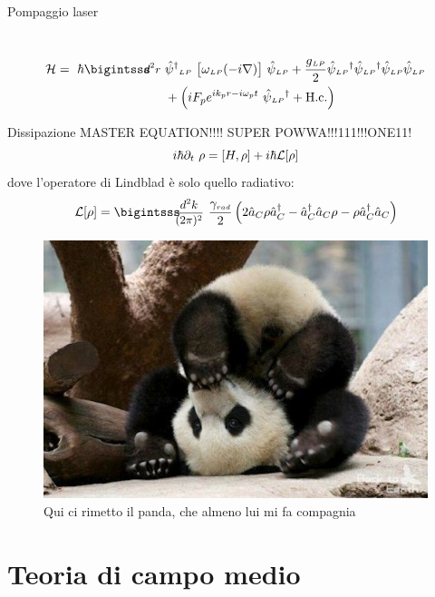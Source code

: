 \documentclass[10pt]{beamer}
\begin{document}
\begin{frame}{Pompaggio laser}
{\begin{columns}
\begin{column}{.6\textwidth}
\begin{figure}
      \end{figure}
  \end{column}
 \end{columns}
}
\normalsize
\begin{align*}
  \ham = \ \hbar \intr & \opsi^\dagger\lp \ \big[ \omega\lp(-i\nabla) \big]\ \opsi\lp + \frac{g\lp}{2} \opsi\lp^\dagger  \opsi\lp^\dagger  \opsi\lp  \opsi\lp \\
        &+ \left( i F_p e^{ik_p r -i\omega_p t} \ \opsi\lp^\dagger + \hc \right)
\end{align*}

\end{frame}


\begin{frame}{Dissipazione}
MASTER EQUATION!!!! \alert{SUPER POWWA}!!!111!!!ONE11!
{\Large
\begin{equation*}
i\hbar \partial_t\ \rho = [H,\rho] + i\hbar \mathcal{L}[\rho]
\end{equation*}
}
dove l'operatore di Lindblad è solo quello radiativo:
\begin{equation*}
\lind \rho = \intk \frac{\gamma_{{\scriptscriptstyle rad}}}{2} \left ( 2\oa_C\rho \oa_C^\dagger - \oa_C^\dagger \oa_C \rho - \rho \oa_C^\dagger \oa_C \right )
\end{equation*}

\begin{figure}
       \includegraphics[scale=.3]{files/Panda.jpg}
       \caption{\footnotesize Qui ci rimetto il panda, che almeno lui mi fa compagnia}
      \end{figure}
 \end{frame}


\section{Teoria di campo medio}
\end{document}
